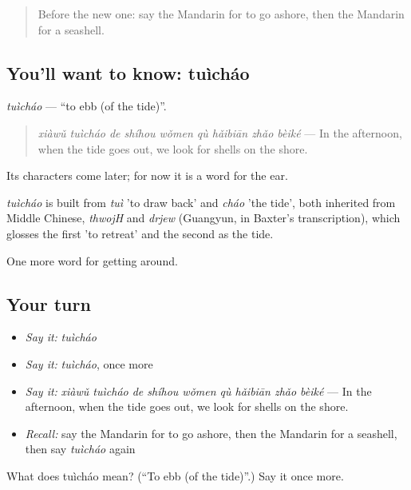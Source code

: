 \label{lesson:ZH-C445-tuichao}



\begin{quote}
Before the new one: say the Mandarin for to go ashore, then the Mandarin for a seashell.
\end{quote}

\subsection*{You'll want to know: tuìcháo}
\emph{tuìcháo} — \textquotedblleft{}to ebb (of the tide)\textquotedblright{}.

\begin{quote}
\emph{xiàwǔ tuìcháo de shíhou wǒmen qù hǎibiān zhǎo bèiké} — In the afternoon, when the tide goes out, we look for shells on the shore.
\end{quote}

Its characters come later; for now it is a word for the ear.

\begin{cousinweb}
\emph{tuìcháo} is built from \emph{tuì} 'to draw back' and \emph{cháo} 'the tide', both inherited from Middle Chinese, \emph{thwojH} and \emph{drjew} (Guangyun, in Baxter's transcription), which glosses the first 'to retreat' and the second as the tide.
\end{cousinweb}

\begin{grammarlens}[title={What you've built}]
One more word for getting around.
\end{grammarlens}

\subsection*{Your turn}
\begin{itemize}
\raggedright
  \item \emph{Say it:} \emph{tuìcháo}
  \item \emph{Say it:} \emph{tuìcháo}, once more
  \item \emph{Say it:} \emph{xiàwǔ tuìcháo de shíhou wǒmen qù hǎibiān zhǎo bèiké} — In the afternoon, when the tide goes out, we look for shells on the shore.
  \item \emph{Recall:} say the Mandarin for to go ashore, then the Mandarin for a seashell, then say \emph{tuìcháo} again
\end{itemize}

\begin{tcolorbox}[breakable,colback=teal!4,colframe=teal!35!black,title={Before you move on}]
What does tuìcháo mean? (\textquotedblleft{}To ebb (of the tide)\textquotedblright{}.) Say it once more.
\end{tcolorbox}
